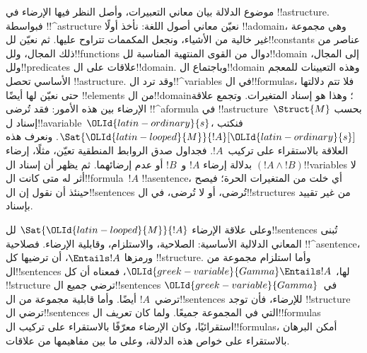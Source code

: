 \documentclass[../../../include/open-logic-section]{subfiles}
\begin{document}


موضوع الدلالة بيان معاني التعبيرات، وأصل النظر فيها الإرضاء في
!!a{structure}. فبواسطة !!^a{structure} نعيّن معاني أصول اللغة:
نأخذ أولًا !!a{domain}، وهي مجموعة غير خالية من الأشياء، ونجعل
المكممات تتراوح عليها. ثم نعيّن لل!!{constant}s عناصر من ذلك
المجال، ولل!!{function}s دوال من القوى المنتهية المناسبة
لل!!{domain} إلى المجال، ولل!!{predicate}s علاقات على
ال!!{domain}. وباجتماع ال!!{domain} وهذه التعيينات للمعجم الأساسي
تحصل !!a{structure}. وقد ترد ال!!^{variable}s في ال!!{formula}s،
فلا تتم دلالتها حتى نعيّن لها أيضًا !!{element}s من
ال!!{domain}؛ وهذا هو إسناد المتغيرات. وتجمع علاقة الإرضاء بين
هذه الأمور: فقد تُرضى !!^a{formula} في
!!a{structure}~$\Struct{M}$ بحسب إسناد ل!!a{variable}~$\OLId{latin-ordinary}{s}$،
فنكتب $\Sat{\OLId{latin-looped}{M}}{!A}[\OLId{latin-ordinary}{s}]$. ونعرف هذه العلاقة بالاستقراء على تركيب~$!A$.
فجداول صدق الروابط المنطقية تعيّن، مثلًا، إرضاء $(!A \land !B)$
بدلالة إرضاء $!A$ و~$!B$ أو عدم إرضائهما. ثم يظهر أن إسناد
ال!!{variable}s لا أثر له متى كانت ال!!{formula}~$!A$ !!a{sentence}،
أي خلت من المتغيرات الحرة؛ فيصح حينئذ أن نقول إن
ال!!{sentence}s تُرضى، أو لا تُرضى، في ال!!{structure}s من غير
تقييد بإسناد.

وعلى علاقة الإرضاء $\Sat{\OLId{latin-looped}{M}}{!A}$ لل!!{sentence}s تُبنى المعاني
الدلالية الأساسية: الصلاحية، والاستلزام، وقابلية الإرضاء.
فصلاحية !!^a{sentence}، ورمزها $\Entails !A$، أن ترضيها كل
!!{structure}. وأما استلزام مجموعة من ال!!{sentence}s لها،
$\OLId{greek-variable}{Gamma} \Entails !A$، فمعناه أن كل !!{structure} ترضي جميع
ال!!{sentence}s في~$\OLId{greek-variable}{Gamma}$ ترضي~$!A$ أيضًا. وأما قابلية مجموعة من
ال!!{sentence}s للإرضاء، فأن توجد !!{structure} ترضي
ال!!{sentence}s التي في المجموعة جميعًا. ولما كان تعريف
ال!!{formula}s استقرائيًا، وكان الإرضاء معرّفًا بالاستقراء على
تركيب ال!!{formula}s، أمكن البرهان بالاستقراء على خواص هذه الدلالة،
وعلى ما بين مفاهيمها من علاقات.
\end{document}
